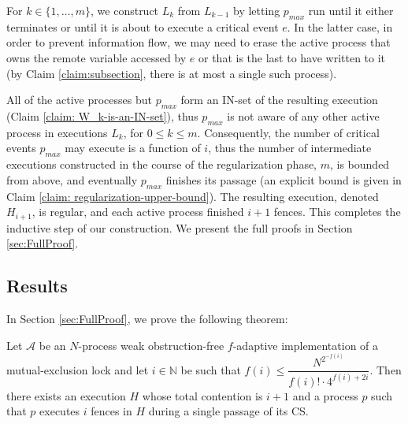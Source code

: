 For $k \in \{1, \ldots, m\}$, we construct $L_k$ from $L_{k-1}$ by letting $p_{max}$ run until it either terminates or until it is about to execute a critical event $e$. In the latter case, in order to prevent information flow, we may need to erase the active process that owns the remote variable accessed by $e$ or that is the last to have written to it (by Claim \ref{claim:subsection}, there is at most a single such process).

All of the active processes but $p_{max}$ form an IN-set of the resulting execution (Claim \ref{claim: W_k-is-an-IN-set}), thus $p_{max}$ is not aware of any other active process in executions $L_k$, for $0 \leq k \leq m$. Consequently, the number of critical events $p_{max}$ may execute is a function of $i$, thus the number of intermediate executions constructed in the course of the regularization phase, $m$, is bounded from above, and eventually $p_{max}$ finishes its passage (an explicit bound is given in Claim \ref{claim: regularization-upper-bound}). The resulting execution, denoted $H_{i+1}$, is regular, and each active process finished $i+1$ fences. This completes the inductive step of our construction. We present the full proofs in Section \ref{sec:FullProof}.

\subsection{Results}

In Section \ref{sec:FullProof}, we prove the following theorem:

\begin{theorem} \label{main-theorem}
	Let $\mathcal{A}$ be an $N$-process weak obstruction-free $f$-adaptive implementation of a mutual-exclusion lock and let $i \in \mathbb{N}$ be such that $f(i) \leq \dfrac{N^{2^{-f(i)}}} {f(i)! \cdot 4^{f(i)+2i}}$.
	Then there exists an execution $H$  whose total contention is $i+1$ and a process $p$ such that $p$ executes $i$ fences in $H$ during a single passage of its CS.
\end{theorem}

